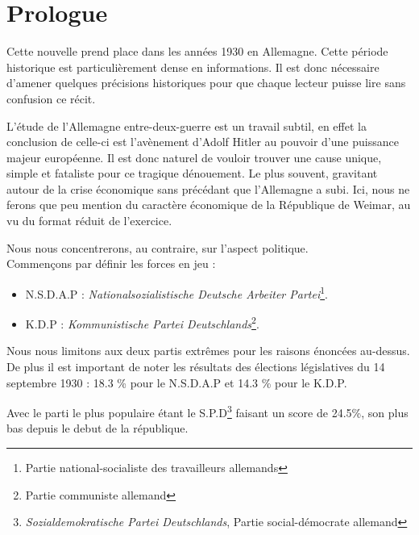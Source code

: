\part*{Prologue}

\raggedright

Cette nouvelle prend place dans les années 1930 en Allemagne.
Cette période historique est particulièrement dense en informations.
Il est donc nécessaire d'amener quelques précisions historiques pour que chaque lecteur puisse lire sans confusion ce récit.

L'étude de l'Allemagne entre-deux-guerre est un travail subtil, 
en effet la conclusion de celle-ci est l'avènement d'Adolf Hitler au pouvoir d'une puissance majeur européenne.
Il est donc naturel de vouloir trouver une cause unique, simple et fataliste pour ce tragique dénouement.
Le plus souvent, gravitant autour de la crise économique sans précédant que l'Allemagne a subi. 
Ici, nous ne ferons que peu mention du caractère économique de la République de Weimar, au vu du format réduit de l'exercice.

Nous nous concentrerons, au contraire, sur l'aspect politique.\\
Commençons par définir les forces en jeu :

\begin{itemize}
    \item N.S.D.A.P : \textit{Nationalsozialistische Deutsche Arbeiter Partei}\footnote{Partie national-socialiste des travailleurs allemands}.
    \item K.D.P : \textit{Kommunistische Partei Deutschlands}\footnote{Partie communiste allemand}.
\end{itemize}

Nous nous limitons aux deux partis extrêmes pour les raisons énoncées au-dessus.\\
De plus il est important de noter les résultats des élections législatives du 14 septembre 1930 :
18.3 \% pour le N.S.D.A.P et 14.3 \% pour le K.D.P.

Avec le parti le plus populaire étant le S.P.D\footnote{\textit{Sozialdemokratische Partei Deutschlands}, Partie social-démocrate allemand} faisant un score de 24.5\%, son plus bas depuis le debut de la république.

